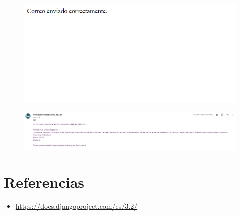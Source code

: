 \documentclass{article}
\begin{document}
	\begin{figure}[H]
		\centering
		\includegraphics[width=1.0\textwidth, keepaspectratio]{img/pagina6}
	\end{figure}
	
	\begin{figure}[H]
		\centering
		\includegraphics[width=1.0\textwidth, keepaspectratio]{img/pagina7}
	\end{figure}
		
	
	
	
	\clearpage
	
	\section{Referencias}
	\begin{itemize}			
		\item \url{https://docs.djangoproject.com/es/3.2/}
	\end{itemize}	
	
	
\end{document}
